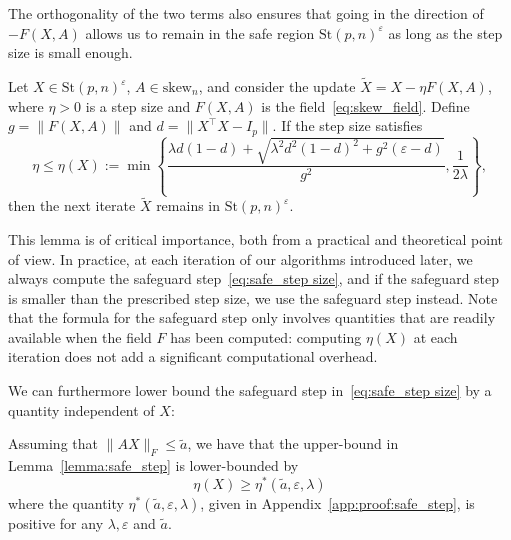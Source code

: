 \documentclass[twoside,11pt]{article}
\newcommand{\stiefel}{{\mathrm{St}(p, n)}}
\newcommand{\sk}{{\mathrm{skew}}}
\begin{document}
The orthogonality of the two terms also ensures that going in the direction of $-F(X, A)$ allows us to remain in the safe region $\stiefel^\varepsilon$ as long as the step size is small enough.


\begin{lemma} \label{lemma:safe_step}
 Let $X\in \stiefel^\varepsilon$, $A \in \sk_n$, and consider the update $\tilde{X} =X - \eta F(X, A)$, where $\eta > 0$ is a step size and $F(X,A)$ is the field~\eqref{eq:skew_field}. Define $g = \| F(X, A)\|$ and $d = \|X^\top X - I_p\|$. If the step size satisfies 
  \begin{equation} \label{eq:safe_step size}
      \eta \leq \eta(X) := \min \left\{ \frac{\lambda d (1-d) + \sqrt{\lambda^2 d^2 (1-d)^2 + g^2 (\varepsilon - d)}}{g^2}, \frac{1}{2\lambda} \right\},
  \end{equation}
  then the next iterate $\tilde{X}$ remains in $\stiefel^\varepsilon$.
  \end{lemma}
%
%

%
%
%
%
%
%
%
%
%
%
%
%
%
%
%
%
%
%
%
%

This lemma is of critical importance, both from a practical and theoretical point of view. In practice, at each iteration of our algorithms introduced later, we always compute the safeguard step~\eqref{eq:safe_step size}, and if the safeguard step is smaller than the prescribed step size, we use the safeguard step instead. 
%
Note that the formula for the safeguard step only involves quantities that are readily available when the field $F$ has been computed: computing $\eta(X)$ at each iteration does not add a significant computational overhead.
%
%

We can furthermore lower bound the safeguard step in~\eqref{eq:safe_step size} 
by a quantity independent of $X$:
\begin{lemma}\label{lemma:safe_step size_lower}
    Assuming that $\|A X\|_F\leq \tilde{a}$, we have that the upper-bound in Lemma~\ref{lemma:safe_step} is lower-bounded by
    \begin{equation}
        \eta(X) \geq \eta^*(\tilde{a}, \varepsilon, \lambda) 
    \end{equation}
    where the quantity $ \eta^*(\tilde{a}, \varepsilon, \lambda)$, given in Appendix~\ref{app:proof:safe_step}, is positive for any $\lambda, \varepsilon$ and $\tilde{a}$.
\end{lemma}
%
%
%
%
%
%
%
%
%
%
%
%
%
%
%
%
%
%

%
%
%
%
%
%
%
%
\end{document}
